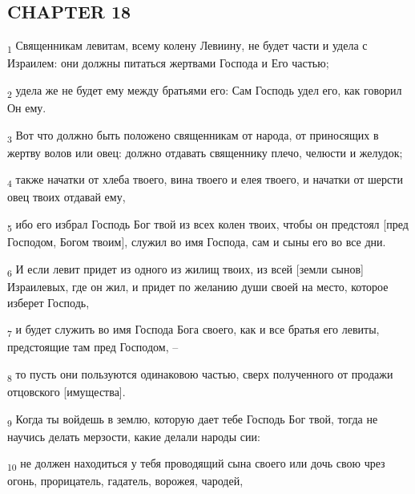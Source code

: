 \subsection{CHAPTER 18}
\begin{tcolorbox}
\textsubscript{1} Священникам левитам, всему колену Левиину, не будет части и удела с Израилем: они должны питаться жертвами Господа и Его частью;
\end{tcolorbox}
\begin{tcolorbox}
\textsubscript{2} удела же не будет ему между братьями его: Сам Господь удел его, как говорил Он ему.
\end{tcolorbox}
\begin{tcolorbox}
\textsubscript{3} Вот что должно быть положено священникам от народа, от приносящих в жертву волов или овец: должно отдавать священнику плечо, челюсти и желудок;
\end{tcolorbox}
\begin{tcolorbox}
\textsubscript{4} также начатки от хлеба твоего, вина твоего и елея твоего, и начатки от шерсти овец твоих отдавай ему,
\end{tcolorbox}
\begin{tcolorbox}
\textsubscript{5} ибо его избрал Господь Бог твой из всех колен твоих, чтобы он предстоял [пред Господом, Богом твоим], служил во имя Господа, сам и сыны его во все дни.
\end{tcolorbox}
\begin{tcolorbox}
\textsubscript{6} И если левит придет из одного из жилищ твоих, из всей [земли сынов] Израилевых, где он жил, и придет по желанию души своей на место, которое изберет Господь,
\end{tcolorbox}
\begin{tcolorbox}
\textsubscript{7} и будет служить во имя Господа Бога своего, как и все братья его левиты, предстоящие там пред Господом, --
\end{tcolorbox}
\begin{tcolorbox}
\textsubscript{8} то пусть они пользуются одинаковою частью, сверх полученного от продажи отцовского [имущества].
\end{tcolorbox}
\begin{tcolorbox}
\textsubscript{9} Когда ты войдешь в землю, которую дает тебе Господь Бог твой, тогда не научись делать мерзости, какие делали народы сии:
\end{tcolorbox}
\begin{tcolorbox}
\textsubscript{10} не должен находиться у тебя проводящий сына своего или дочь свою чрез огонь, прорицатель, гадатель, ворожея, чародей,
\end{tcolorbox}
